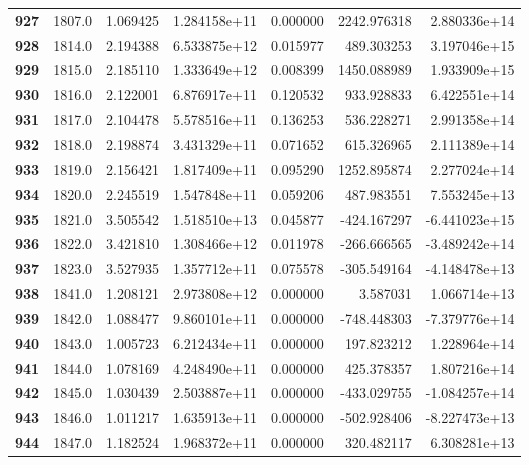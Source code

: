 \documentclass{report}[12pt]
\begin{document}
\begin{center}
\begin{tabular}{lrrrrrr}
\textbf{927 } &         1807.0 &   1.069425 &  1.284158e+11 &    0.000000 &  2242.976318 &  2.880336e+14 \\
\textbf{928 } &         1814.0 &   2.194388 &  6.533875e+12 &    0.015977 &   489.303253 &  3.197046e+15 \\
\textbf{929 } &         1815.0 &   2.185110 &  1.333649e+12 &    0.008399 &  1450.088989 &  1.933909e+15 \\
\textbf{930 } &         1816.0 &   2.122001 &  6.876917e+11 &    0.120532 &   933.928833 &  6.422551e+14 \\
\textbf{931 } &         1817.0 &   2.104478 &  5.578516e+11 &    0.136253 &   536.228271 &  2.991358e+14 \\
\textbf{932 } &         1818.0 &   2.198874 &  3.431329e+11 &    0.071652 &   615.326965 &  2.111389e+14 \\
\textbf{933 } &         1819.0 &   2.156421 &  1.817409e+11 &    0.095290 &  1252.895874 &  2.277024e+14 \\
\textbf{934 } &         1820.0 &   2.245519 &  1.547848e+11 &    0.059206 &   487.983551 &  7.553245e+13 \\
\textbf{935 } &         1821.0 &   3.505542 &  1.518510e+13 &    0.045877 &  -424.167297 & -6.441023e+15 \\
\textbf{936 } &         1822.0 &   3.421810 &  1.308466e+12 &    0.011978 &  -266.666565 & -3.489242e+14 \\
\textbf{937 } &         1823.0 &   3.527935 &  1.357712e+11 &    0.075578 &  -305.549164 & -4.148478e+13 \\
\textbf{938 } &         1841.0 &   1.208121 &  2.973808e+12 &    0.000000 &     3.587031 &  1.066714e+13 \\
\textbf{939 } &         1842.0 &   1.088477 &  9.860101e+11 &    0.000000 &  -748.448303 & -7.379776e+14 \\
\textbf{940 } &         1843.0 &   1.005723 &  6.212434e+11 &    0.000000 &   197.823212 &  1.228964e+14 \\
\textbf{941 } &         1844.0 &   1.078169 &  4.248490e+11 &    0.000000 &   425.378357 &  1.807216e+14 \\
\textbf{942 } &         1845.0 &   1.030439 &  2.503887e+11 &    0.000000 &  -433.029755 & -1.084257e+14 \\
\textbf{943 } &         1846.0 &   1.011217 &  1.635913e+11 &    0.000000 &  -502.928406 & -8.227473e+13 \\
\textbf{944 } &         1847.0 &   1.182524 &  1.968372e+11 &    0.000000 &   320.482117 &  6.308281e+13 \\

\end{tabular}
\end{center}
\end{document}
